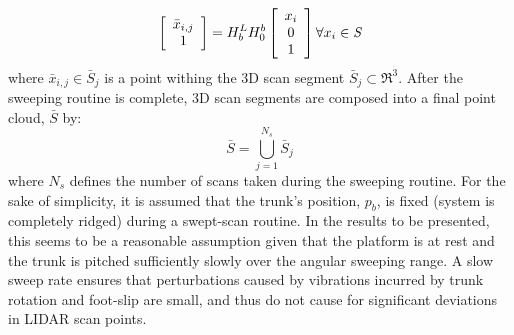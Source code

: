 				\begin{equation}
					\left[
						\begin{array}{c}
							\bar{x}_{i,j} \\ 1
						\end{array}
					\right]
				 = H^{L}_{b} H^{b}_{0}	
					\left[
						\begin{array}{c}
							x_{i} \\ 0 \\ 1
						\end{array}
					\right] \forall x_{i} \in \emph{S}
					\label{eq::scan_to_segment}
				\end{equation}
			where $\bar{x}_{i,j} \in \bar{S}_{j}$ is a point withing the 3D \Jth scan segment $\bar{S}_{j} \subset \Re^{3}$. After the sweeping routine is complete, 3D scan segments are composed into a final point cloud, $\bar{S}$ by:
			\begin{equation}
				\bar{S} = \bigcup_{j=1}^{N_{s}} \bar{S}_{j}
			\end{equation}
			where $N_{s}$ defines the number of scans taken during the sweeping routine. For the sake of simplicity, it is assumed that the trunk's position, $p_{b}$, is fixed (system is completely ridged) during a swept-scan routine. In the results to be presented, this seems to be a reasonable assumption given that the platform is at rest and the trunk is pitched sufficiently slowly over the angular sweeping range. A slow sweep rate ensures that perturbations caused by vibrations incurred by trunk rotation and foot-slip are small, and thus do not cause for significant deviations in LIDAR scan points.
